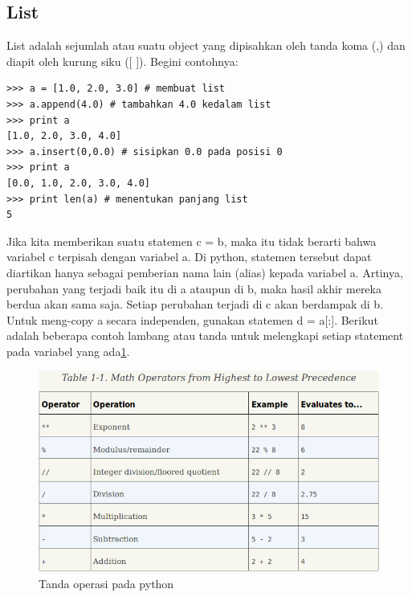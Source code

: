 \subsection{List}
List adalah sejumlah atau suatu object yang dipisahkan oleh tanda koma (,) dan diapit oleh kurung siku
([ ]). Begini contohnya:
\begin{verbatim}
>>> a = [1.0, 2.0, 3.0] # membuat list
>>> a.append(4.0) # tambahkan 4.0 kedalam list
>>> print a
[1.0, 2.0, 3.0, 4.0]
>>> a.insert(0,0.0) # sisipkan 0.0 pada posisi 0
>>> print a
[0.0, 1.0, 2.0, 3.0, 4.0]
>>> print len(a) # menentukan panjang list
5
\end{verbatim}
Jika kita memberikan suatu statemen c = b, maka itu tidak berarti bahwa variabel c terpisah dengan
variabel a. Di python, statemen tersebut dapat diartikan hanya sebagai pemberian nama lain
(alias) kepada variabel a. Artinya, perubahan yang terjadi baik itu di a ataupun di b, maka hasil
akhir mereka berdua akan sama saja. Setiap perubahan terjadi di c akan berdampak di b.
Untuk meng-copy a secara independen, gunakan statemen d = a[:]. 
Berikut adalah beberapa contoh lambang atau tanda untuk melengkapi setiap statement pada
variabel yang ada\ref{operate}.
\begin{figure}[ht]
    \centerline{\includegraphics[width=1\textwidth]{figures/operate.png}}
    \caption{Tanda operasi pada python}
    \label{operate}
    \end{figure}
